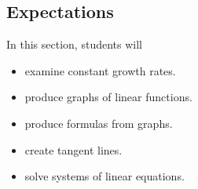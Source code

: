 \documentclass{ximera}
\begin{document}
\subsection{Expectations}



\begin{sectionOutcomes}
In this section, students will 

\begin{itemize}
\item examine constant growth rates.
\item produce graphs of linear functions.
\item produce formulas from graphs.
\item create tangent lines.
\item solve systems of linear equations.
\end{itemize}
\end{sectionOutcomes}
\end{document}
